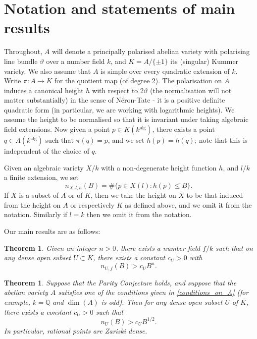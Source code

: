\documentclass[a4paper,12pt]{amsart}
\newtheorem{theorem}[definition]{Theorem}
\begin{document}
\section{Notation and statements of main results}\label{sec:notation}

Throughout, $A$ will denote a principally polarised abelian variety with polarising line bundle $\vartheta$ over a number field $k$, and $K = A/\{\pm 1\}$ its (singular) Kummer variety. We also assume that $A$ is simple over every quadratic extension of $k$. Write $\pi:A {\rightarrow} K$ for the quotient map (of degree 2). 
The polarisation on $A$ induces a canonical height $h$ with respect to $2\vartheta$ (the normalisation will not matter substantially) in the sense of N\'eron-Tate - it is a positive definite quadratic form (in particular, we are working with logarithmic heights). We assume the height to be normalised so that it is invariant under taking algebraic field extensions. Now given a point $p \in K(k{^{\textrm{alg}}})$, there exists a point $q \in A(k{^{\textrm{alg}}})$ such that $\pi(q) = p$, and we set $h(p) = h(q)$; note that this is independent of the choice of $q$. 

Given an algebraic variety $X/k$ with a non-degenerate height function $h$, and $l/k$ a finite extension, we set
\begin{equation*}
n_{X,l, h}(B) = \#\{ p \in X(l) : h(p) \le B \}. 
\end{equation*}
If $X$ is a subset of $A$ or of $K$, then we take the height on $X$ to be that induced from the height on $A$ or respectively $K$ as defined above, and we omit it from the notation. Similarly if $l=k$ then we omit it from the notation. 

Our main results are as follows:

\begin{theorem}\label{thm1} Given an integer $n>0$, there exists a number field $f/k$ such that on any dense open subset $U \subset K$, there exists a constant $c_U > 0$ with
\begin{equation}
n_{U,f}(B) > c_U B^n. 
\end{equation}
\end{theorem}

\begin{theorem}\label{thm2} Suppose that the Parity Conjecture holds, and suppose that the abelian variety $A$ satisfies one of the conditions given in \ref{conditions_on_A} (for example, $k = \mathbb{Q}$ and $\dim(A)$ is odd). Then for any dense open subset $U$ of $K$, there exists a constant $c_U >0$ such that
\begin{equation}
n_U(B) > c_U B^{1/2}. 
\end{equation}
In particular, rational points are Zariski dense. 
\end{theorem}
\end{document}
